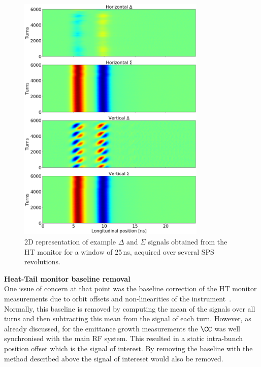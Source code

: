 \begin{figure}[!h]
   \centering         
   \includegraphics[width=0.8\textwidth]{images/Ch4/HT_2D__20180530_114730.png}
       \caption{2D representation of example $\Delta$ and $\Sigma$ signals obtained from the HT monitor for a window of 25\,ns, acquired over several SPS revolutions.}
       \label{fig:HT_example_acq_multTurns_2D}
\end{figure}

\normalsize{\textbf{Heat-Tail monitor baseline removal}}\\
One issue of concern at that point was the baseline correction of the HT monitor measurements due to orbit offsets and non-linearities of the instrument~\cite{Levens:2313358}.  %
Normally, this baseline is removed by computing the mean of the signals over all turns and then subtracting this mean from the signal of each turn. However, as already discussed, for the emittance growth measurements the $\CC$ was well synchronised with the main RF system. This resulted in a static intra-bunch position offset which is the signal of interest. By removing the baseline with the method described above the signal of intereset would also be removed.


